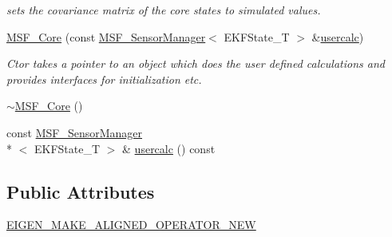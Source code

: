 \begin{DoxyCompactItemize}
\begin{DoxyCompactList}\small\item\em sets the covariance matrix of the core states to simulated values. \end{DoxyCompactList}\item 
\hyperlink{classmsf__core_1_1MSF__Core_ad55343b1396263b7a1f2b5599d0fc4e0}{M\-S\-F\-\_\-\-Core} (const \hyperlink{classmsf__core_1_1MSF__SensorManager}{M\-S\-F\-\_\-\-Sensor\-Manager}$<$ E\-K\-F\-State\-\_\-\-T $>$ \&\hyperlink{classmsf__core_1_1MSF__Core_a4685230ba43fd684aaf6d6b891c29fca}{usercalc})
\begin{DoxyCompactList}\small\item\em Ctor takes a pointer to an object which does the user defined calculations and provides interfaces for initialization etc. \end{DoxyCompactList}\item 
\hyperlink{classmsf__core_1_1MSF__Core_ad90237464018c6270b3d15d79957ed52}{$\sim$\-M\-S\-F\-\_\-\-Core} ()
\item 
const \hyperlink{classmsf__core_1_1MSF__SensorManager}{M\-S\-F\-\_\-\-Sensor\-Manager}\\*
$<$ E\-K\-F\-State\-\_\-\-T $>$ \& \hyperlink{classmsf__core_1_1MSF__Core_a4685230ba43fd684aaf6d6b891c29fca}{usercalc} () const 
\end{DoxyCompactItemize}
\subsection*{Public Attributes}
\begin{DoxyCompactItemize}
\item 
\hyperlink{classmsf__core_1_1MSF__Core_aad8769aeb9efa04de99604dd397a47a8}{E\-I\-G\-E\-N\-\_\-\-M\-A\-K\-E\-\_\-\-A\-L\-I\-G\-N\-E\-D\-\_\-\-O\-P\-E\-R\-A\-T\-O\-R\-\_\-\-N\-E\-W}
\end{DoxyCompactItemize}
